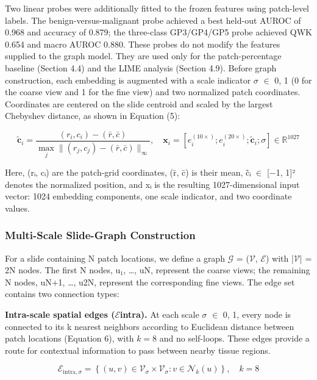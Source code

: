 \documentclass[11pt,a4paper]{article}
\begin{document}
Two linear probes were additionally fitted to the frozen features using patch-level labels. The benign-versus-malignant probe achieved a best held-out AUROC of 0.968 and accuracy of 0.879; the three-class GP3/GP4/GP5 probe achieved QWK 0.654 and macro AUROC 0.880. These probes do not modify the features supplied to the graph model. They are used only for the patch-percentage baseline (Section 4.4) and the LIME analysis (Section 4.9). Before graph construction, each embedding is augmented with a scale indicator $\sigma$ $\in$ {0, 1} (0 for the coarse view and 1 for the fine view) and two normalized patch coordinates. Coordinates are centered on the slide centroid and scaled by the largest Chebyshev distance, as shown in Equation (5):


\begin{equation}
\tilde{\mathbf{c}}_i = \frac{(r_i, c_i) - (\bar{r}, \bar{c})}{\max_j \|(r_j, c_j) - (\bar{r}, \bar{c})\|_\infty}, \quad \mathbf{x}_i = \left[ e_i^{(10\times)}; e_i^{(20\times)}; \tilde{\mathbf{c}}_i; \sigma \right] \in \mathbb{R}^{1027}
\label{eq:norm_coords}
\end{equation}

Here, (rᵢ, cᵢ) are the patch-grid coordinates, (r̄, c̄) is their mean, c̃ᵢ $\in$ [−1, 1]² denotes the normalized position, and xᵢ is the resulting 1027-dimensional input vector: 1024 embedding components, one scale indicator, and two coordinate values.


\subsubsection{Multi-Scale Slide-Graph Construction}
For a slide containing N patch locations, we define a graph $\mathcal{G}$ = ($\mathcal{V}$, $\mathcal{E}$) with |$\mathcal{V}$| = 2N nodes. The first N nodes, u₁, …, uN, represent the coarse views; the remaining N nodes, uN+1, …, u2N, represent the corresponding fine views. The edge set contains two connection types:

\noindent \textbf{Intra-scale spatial edges ($\mathcal{E}$intra).} At each scale $\sigma$ $\in$ {0, 1}, every node is connected to its k nearest neighbors according to Euclidean distance between patch locations (Equation 6), with $k = 8$ and no self-loops. These edges provide a route for contextual information to pass between nearby tissue regions.


\begin{equation}
\mathcal{E}_{\text{intra},\sigma} = \left\{ (u, v) \in \mathcal{V}_\sigma \times \mathcal{V}_\sigma : v \in \mathcal{N}_k(u) \right\}, \quad k = 8
\label{eq:intra_edges}
\end{equation}
\end{document}
